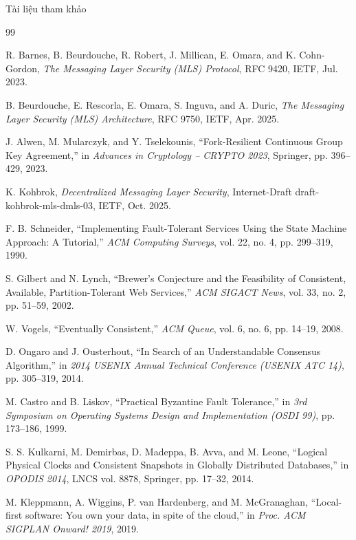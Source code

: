 \documentclass[t, aspectratio=169]{beamer}
\begin{document}
\begin{frame}[allowframebreaks]{Tài liệu tham khảo}
	\footnotesize
	\begin{thebibliography}{99}

		R. Barnes, B. Beurdouche, R. Robert, J. Millican, E. Omara, and K. Cohn-Gordon,
		\emph{The Messaging Layer Security (MLS) Protocol}, RFC 9420, IETF, Jul. 2023.

		B. Beurdouche, E. Rescorla, E. Omara, S. Inguva, and A. Duric,
		\emph{The Messaging Layer Security (MLS) Architecture}, RFC 9750, IETF, Apr. 2025.

		J. Alwen, M. Mularczyk, and Y. Tselekounis,
		``Fork-Resilient Continuous Group Key Agreement,''
		in \emph{Advances in Cryptology -- CRYPTO 2023}, Springer, pp. 396--429, 2023.

		K. Kohbrok, \emph{Decentralized Messaging Layer Security},
		Internet-Draft draft-kohbrok-mls-dmls-03, IETF, Oct. 2025.

		F. B. Schneider,
		``Implementing Fault-Tolerant Services Using the State Machine Approach: A Tutorial,''
		\emph{ACM Computing Surveys}, vol. 22, no. 4, pp. 299--319, 1990.

		S. Gilbert and N. Lynch,
		``Brewer's Conjecture and the Feasibility of Consistent, Available, Partition-Tolerant Web Services,''
		\emph{ACM SIGACT News}, vol. 33, no. 2, pp. 51--59, 2002.

		W. Vogels, ``Eventually Consistent,'' \emph{ACM Queue}, vol. 6, no. 6, pp. 14--19, 2008.

		D. Ongaro and J. Ousterhout,
		``In Search of an Understandable Consensus Algorithm,''
		in \emph{2014 USENIX Annual Technical Conference (USENIX ATC 14)}, pp. 305--319, 2014.

		M. Castro and B. Liskov,
		``Practical Byzantine Fault Tolerance,''
		in \emph{3rd Symposium on Operating Systems Design and Implementation (OSDI 99)}, pp. 173--186, 1999.

		S. S. Kulkarni, M. Demirbas, D. Madeppa, B. Avva, and M. Leone,
		``Logical Physical Clocks and Consistent Snapshots in Globally Distributed Databases,''
		in \emph{OPODIS 2014}, LNCS vol. 8878, Springer, pp. 17--32, 2014.

		M. Kleppmann, A. Wiggins, P. van Hardenberg, and M. McGranaghan,
		``Local-first software: You own your data, in spite of the cloud,''
		in \emph{Proc. ACM SIGPLAN Onward! 2019}, 2019.


\end{thebibliography}
\end{frame}
\end{document}
